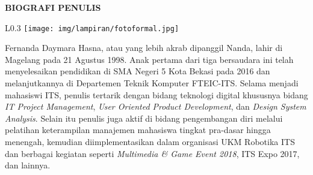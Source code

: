 \begin{center}
\Large\textbf{BIOGRAFI PENULIS}
\end{center}
\vspace{1ex}

\begin{wrapfigure}{L}{0.3\textwidth}
	\centering
	\vspace{-3ex}	
	\texttt{[image: img/lampiran/fotoformal.jpg]}
	\vspace{-4ex}
\end{wrapfigure}
\noindent 
Fernanda Daymara Hasna, atau yang lebih akrab dipanggil Nanda, lahir di Magelang pada 21 Agustus 1998. Anak pertama dari tiga bersaudara ini telah menyelesaikan pendidikan di SMA Negeri 5 Kota Bekasi pada 2016 dan melanjutkannya di Departemen Teknik Komputer FTEIC-ITS. Selama menjadi mahasiswi ITS, penulis tertarik dengan bidang teknologi digital khususnya bidang \textit{IT Project Management}, \textit{User Oriented Product Development}, dan \textit{Design System Analysis}. Selain itu penulis juga aktif di bidang pengembangan diri melalui pelatihan keterampilan manajemen mahasiswa tingkat pra-dasar hingga menengah, kemudian diimplementasikan dalam organisasi UKM Robotika ITS dan berbagai kegiatan seperti \textit{Multimedia \& Game Event 2018}, ITS Expo 2017, dan lainnya.
